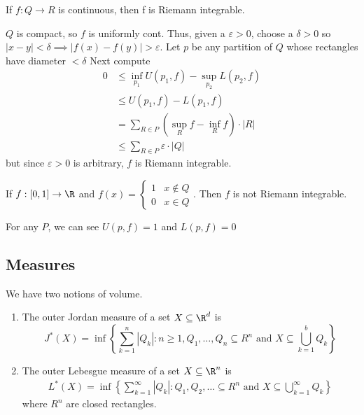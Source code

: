\begin{theorem}
	If $f : Q \to R$ is continuous, then f is Riemann integrable.
\end{theorem}

\begin{solution}
	$Q$ is compact, so  $f$ is uniformly cont. Thus, given a $\varepsilon >0 $, choose a $\delta >0$ so  $|x-y| < \delta \implies |f(x) - f(y)| > \varepsilon$. Let $p$ be any partition of $Q$ whose rectangles have diameter  $< \delta$ \newline
	Next compute
	\begin{align*}
		0 &\leq \inf_{p_1} U(p_1, f) - \sup_{p_2} L(p_2, f) \\
			&\leq U(p_1, f) - L(p_1, f) \\
		  &= \sum_{R \in P}^{} \left( \sup_{R} f - \inf_{R}f \right) \cdot |R| \\
		  &\leq \sum_{R \in P}^{} \varepsilon \cdot |Q|
	\end{align*}
	but since $\varepsilon > 0$ is arbitrary,  $f$ is Riemann integrable.
\end{solution}

\begin{example}
	If $f:[0,1] \to \R$ and $f(x) =
	\begin{cases}
		1 & x \notin Q \\
		0 & x \in Q
	\end{cases}$.
	Then $f$ is not Riemann integrable.
	\begin{solution}
		For any $P$, we can see  $U(p,f) = 1$ and  $L(p,f) = 0$
	\end{solution}
\end{example}

\subsection{Measures}

\noindent We have two notions of volume.
\begin{enumerate}
	\item The outer Jordan measure of a set $X \subseteq \R^d$ is
			\[
				J^* (X)
				= \inf \left\{ \sum_{k=1}^{n} |Q_k| : n \geq 1, Q_1, \ldots, Q_n \subseteq R^n \text{ and }
				X \subseteq \bigcup_{k=1}^{b} Q_k \right\}
			\]
	\item The outer Lebesgue measure of a set $X \subseteq \R^n$ is
		\begin{align*}
			L^*(X)
			= \inf \left\{ \sum_{k=1}^{\infty}|Q_k| : Q_1, Q_2, \ldots \subseteq R^n \text{ and }
			X \subseteq \bigcup_{k=1}^{\infty} Q_k \right\}
		\end{align*}
		where $R^n$ are closed rectangles.
\end{enumerate}

